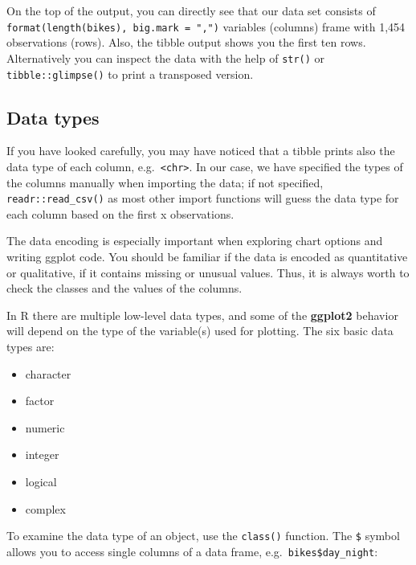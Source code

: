 \documentclass[
]{krantz}
\providecommand{\tightlist}{%
  \setlength{\itemsep}{0pt}\setlength{\parskip}{0pt}}
\begin{document}
On the top of the output, you can directly see that our data set consists of \texttt{format(length(bikes),\ big.mark\ =\ ",")} variables (columns) frame with 1,454 observations (rows). Also, the tibble output shows you the first ten rows. Alternatively you can inspect the data with the help of \texttt{str()} or \texttt{tibble::glimpse()} to print a transposed version.

\hypertarget{classes}{%
\subsection{Data types}\label{classes}}

If you have looked carefully, you may have noticed that a tibble prints also the data type of each column, e.g.~\texttt{\textless{}chr\textgreater{}}. In our case, we have specified the types of the columns manually when importing the data; if not specified, \texttt{readr::read\_csv()} as most other import functions will guess the data type for each column based on the first x observations.

The data encoding is especially important when exploring chart options and writing ggplot code. You should be familiar if the data is encoded as quantitative or qualitative, if it contains missing or unusual values. Thus, it is always worth to check the classes and the values of the columns.

In R there are multiple low-level data types, and some of the \textbf{ggplot2} behavior will depend on the type of the variable(s) used for plotting. The six basic data types are:

\begin{itemize}
\tightlist
\item
  character
\item
  factor
\item
  numeric
\item
  integer
\item
  logical
\item
  complex
\end{itemize}

To examine the data type of an object, use the \texttt{class()} function. The \texttt{\$} symbol allows you to access single columns of a data frame, e.g.~\texttt{bikes\$day\_night}:
\end{document}
